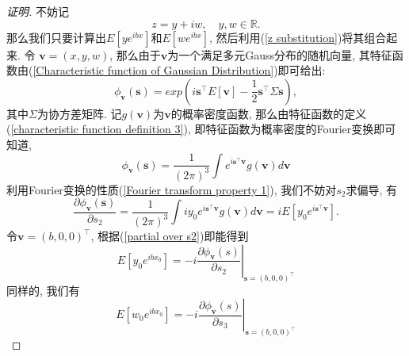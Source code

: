 \documentclass[notitlepage,cs4size,punct,oneside]{ctexrep}
\numberwithin{equation}{section}
\theoremstyle{mystyle}
\begin{document}
\begin{proof}[证明]
不妨记
$$z = y + iw, \quad y, w\in \mathbb{R}. \label{z substitution}$$
那么我们只要计算出$E[ye^{ibx}]$和$E[we^{ibx}]$, 然后利用(\ref{z substitution})将其组合起来. 令
$\textbf{v} = (x, y, w)$, 那么由于$\textbf{v}$为一个满足多元Gauss分布的随机向量, 其特征函数由(\ref{Characteristic function of Gaussian Distribution})即可给出:
\begin{equation} \label{characteristic function of v}
\phi_\textbf{v}(\textbf{s}) = exp(i\textbf{s}^\top E[\textbf{v}]-\frac{1}{2}\textbf{s}^\top\Sigma\textbf{s}),
\end{equation}
其中$\Sigma$为协方差矩阵. 记$g(\textbf{v})$为$\textbf{v}$的概率密度函数, 那么由特征函数的定义(\ref{characteristic function definition 3}), 即特征函数为概率密度的Fourier变换即可知道,
\begin{equation}
\phi_\textbf{v}(\textbf{s}) = \frac{1}{(2\pi)^3}\int e^{i\textbf{s}^\top\textbf{v}}g(\textbf{v})d\textbf{v}
\end{equation}
利用Fourier变换的性质(\ref{Fourier transform property 1}), 我们不妨对$s_2$求偏导\cite{gershgorin2008nonlinear}, 有
\begin{equation} \label{partial over s2}
\frac{\partial \phi_\textbf{v}(\textbf{s})}{\partial s_2} = \frac{1}{(2\pi)^3}\int iy_0e^{i\textbf{s}^\top\textbf{v}}g(\textbf{v})d\textbf{v} = iE\left[y_0e^{i\textbf{s}^\top\textbf{v}}\right].
\end{equation}
令$\textbf{v} = (b, 0, 0)^\top$, 根据(\ref{partial over s2})即能得到
\begin{equation} \label{E over y0}
\left.E[y_0e^{ibx_0}] = -i\frac{\partial \phi_\textbf{v}(s)}{\partial s_2}\right|_{\textbf{s} = (b, 0, 0)^\top}
\end{equation}
同样的, 我们有
\begin{equation} \label{E over w0}
\left.E[w_0e^{ibx_0}] = -i\frac{\partial \phi_\textbf{v}(s)}{\partial s_3}\right|_{\textbf{s} = (b, 0, 0)^\top}
\end{equation}


\end{proof}
\end{document}
